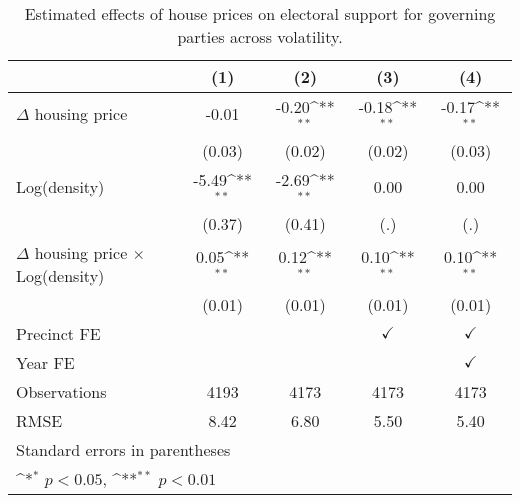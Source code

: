 \begin{table}[htbp]\centering
\def\sym#1{\ifmmode^{#1}\else\(^{#1}\)\fi}
\caption{Estimated effects of house prices on electoral support for governing parties across volatility.} \label{tab5}
\begin{tabular}{l*{4}{c}}
\hline\hline
                    &\multicolumn{1}{c}{(1)}        &\multicolumn{1}{c}{(2)}        &\multicolumn{1}{c}{(3)}        &\multicolumn{1}{c}{(4)}        \\
\hline
$\Delta$ housing price&       -0.01        &       -0.20\sym{**}&       -0.18\sym{**}&       -0.17\sym{**}\\
                    &      (0.03)        &      (0.02)        &      (0.02)        &      (0.03)        \\
[1em]
Log(density)        &       -5.49\sym{**}&       -2.69\sym{**}&        0.00        &        0.00        \\
                    &      (0.37)        &      (0.41)        &         (.)        &         (.)        \\
[1em]
$\Delta$ housing price $\times$ Log(density)&        0.05\sym{**}&        0.12\sym{**}&        0.10\sym{**}&        0.10\sym{**}\\
                    &      (0.01)        &      (0.01)        &      (0.01)        &      (0.01)        \\
[1em]
\hline Precinct FE  &                    &                    &$\checkmark$        &$\checkmark$        \\
[1em]
Year FE             &                    &                    &                    &$\checkmark$        \\
\hline
Observations        &        4193        &        4173        &        4173        &        4173        \\
RMSE                &        8.42        &        6.80        &        5.50        &        5.40        \\
\hline\hline
\multicolumn{5}{l}{\footnotesize Standard errors in parentheses}\\
\multicolumn{5}{l}{\footnotesize \sym{*} \(p<0.05\), \sym{**} \(p<0.01\)}\\
\end{tabular}
\end{table}
